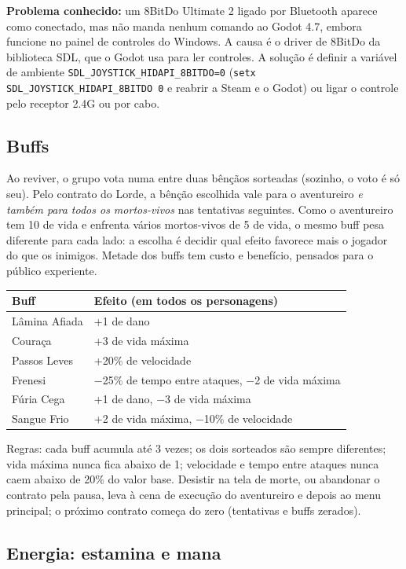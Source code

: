 \documentclass[11pt,a4paper]{article}
\begin{document}
\textbf{Problema conhecido:} um 8BitDo Ultimate 2 ligado por Bluetooth aparece como conectado, mas não manda nenhum comando ao Godot 4.7, embora funcione no painel de controles do Windows. A causa é o driver de 8BitDo da biblioteca SDL, que o Godot usa para ler controles. A solução é definir a variável de ambiente \texttt{SDL\_JOYSTICK\_HIDAPI\_8BITDO=0} (\texttt{setx SDL\_JOYSTICK\_HIDAPI\_8BITDO 0} e reabrir a Steam e o Godot) ou ligar o controle pelo receptor 2.4G ou por cabo.

\subsection{Buffs}

Ao reviver, o grupo vota numa entre duas bênçãos sorteadas (sozinho, o voto é só seu). Pelo contrato do Lorde, a bênção escolhida vale para o aventureiro \emph{e também para todos os mortos-vivos} nas tentativas seguintes. Como o aventureiro tem 10 de vida e enfrenta vários mortos-vivos de 5 de vida, o mesmo buff pesa diferente para cada lado: a escolha é decidir qual efeito favorece mais o jogador do que os inimigos. Metade dos buffs tem custo e benefício, pensados para o público experiente.

\begin{tabularx}{\textwidth}{@{}lX@{}}
\toprule
\textbf{Buff} & \textbf{Efeito (em todos os personagens)} \\
\midrule
Lâmina Afiada & +1 de dano \\
Couraça & +3 de vida máxima \\
Passos Leves & +20\% de velocidade \\
Frenesi & $-$25\% de tempo entre ataques, $-$2 de vida máxima \\
Fúria Cega & +1 de dano, $-$3 de vida máxima \\
Sangue Frio & +2 de vida máxima, $-$10\% de velocidade \\
\bottomrule
\end{tabularx}

Regras: cada buff acumula até 3 vezes; os dois sorteados são sempre diferentes; vida máxima nunca fica abaixo de 1; velocidade e tempo entre ataques nunca caem abaixo de 20\% do valor base. Desistir na tela de morte, ou abandonar o contrato pela pausa, leva à cena de execução do aventureiro e depois ao menu principal; o próximo contrato começa do zero (tentativas e buffs zerados).

\subsection{Energia: estamina e mana}
\label{sec:energia}
\end{document}
